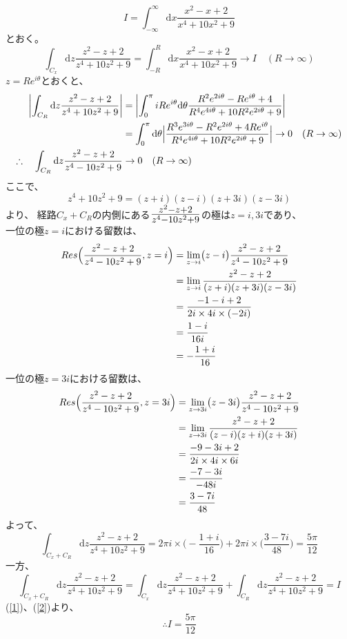 \documentclass[dvipdfmx,a4paper]{jsarticle}
\begin{document}
\subsection{}
$$
I = \int^{\infty}_{-\infty}\mathrm{d}x\frac{x^2 - x + 2}{x^4 + 10x^2 + 9}
$$
とおく。
$$
\int_{C_x}\mathrm{d}z\frac{z^2 - z + 2}{z^4 + 10z^2 + 9} = \int^{R}_{-R}\mathrm{d}x\frac{x^2 - x + 2}{x^4 + 10x^2 + 9} \to I \quad(R \to \infty)
$$
$z = Re^{i\theta}$とおくと、
\begin{align*}
\biggl|\int_{C_R}\mathrm{d}z\frac{z^2 - z + 2}{z^4 + 10z^2 + 9}\biggr| &= \biggl|\int^{\pi}_{0}i Re^{i\theta}\mathrm{d}\theta\frac{R^2e^{2i\theta} - Re^{i\theta} + 4}{R^4e^{4i\theta} + 10R^2e^{2i\theta} + 9}\biggr|\\
&= \int^{\pi}_{0}\mathrm{d}\theta\Bigl|\frac{R^3e^{3i\theta} - R^2e^{2i\theta} + 4Re^{i\theta}}{R^4e^{4i\theta} + 10R^2e^{2i\theta} + 9}\Bigr| \to 0 \quad(R \to \infty)\\
\therefore \quad\int_{C_R}\mathrm{d}z\frac{z^2 - z + 2}{z^4 - 10z^2 + 9} &\to 0 \quad(R \to \infty)
\end{align*}
ここで、
$$z^4 + 10z^2 + 9 = (z+i)(z-i)(z+3i)(z-3i)$$
より、
経路$C_x + C_R$の内側にある$\mbox{\Large$\frac{z^2 - z + 2}{z^4 - 10z^2 + 9}$}$の極は$z =  i,3i$であり、\\
一位の極$z = i$における留数は、
\begin{align*}
Res\Bigl(\frac{z^2 - z + 2}{z^4 - 10z^2 + 9}, z = i\Bigr) &= \lim_{z \to i}\bigl(z - i\bigr)\frac{z^2 - z + 2}{z^4 - 10z^2 + 9}\\
&= \lim_{z \to i}\frac{z^2 - z + 2}{(z+i)(z+3i)(z-3i)}\\
&= \frac{-1-i+2}{2i\times 4i \times (-2i)}\\
&= \frac{1-i}{16i}\\
&= -\frac{1+i}{16}
\end{align*}
一位の極$z = 3i$における留数は、
\begin{align*}
Res\Bigl(\frac{z^2 - z + 2}{z^4 - 10z^2 + 9}, z = 3i\Bigr) &= \lim_{z \to 3i}\bigl(z - 3i\bigr)\frac{z^2 - z + 2}{z^4 - 10z^2 + 9}\\
&= \lim_{z \to 3i}\frac{z^2 - z + 2}{(z-i)(z+i)(z+3i)}\\
&= \frac{-9-3i+2}{2i\times 4i \times 6i}\\
&= \frac{-7-3i}{-48i}\\
&= \frac{3-7i}{48}
\end{align*}
よって、
\begin{equation}
\label{1}
\int_{C_x + C_R}\mathrm{d}z\frac{z^2 - z + 2}{z^4 + 10z^2 + 9} = 2\pi i \times \bigl(-\frac{1+i}{16}\bigr)  + 2\pi i \times \bigl(\frac{3-7i}{48}\bigr) = \frac{5\pi}{12}
\end{equation}
一方、
\begin{equation}
\label{2}
\int_{C_x + C_R}\mathrm{d}z\frac{z^2 - z + 2}{z^4 + 10z^2 + 9} = \int_{C_x}\mathrm{d}z\frac{z^2 - z + 2}{z^4 + 10z^2 + 9} + \int_{C_R}\mathrm{d}z\frac{z^2 - z + 2}{z^4 + 10z^2 + 9} = I
\end{equation}
(\ref{1})、(\ref{2})より、
$$
\therefore I = \frac{5\pi}{12}
$$
\\
\end{document}
